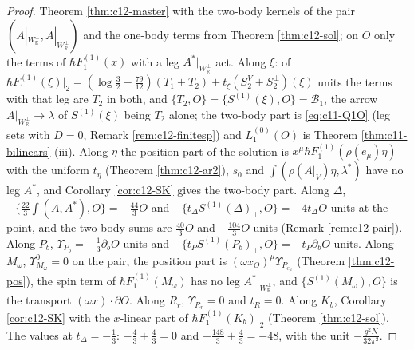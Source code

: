 \begin{proof}
Theorem \ref{thm:c12-master} with the two-body kernels of the pair $(A|_{W_{\mathbb R}^\perp},A|_{W_{\mathbb R}^\perp})$ and the one-body terms from Theorem \ref{thm:c12-sol}; on $O$ only the terms of $\hbar F_1^{(1)}(x)$ with a leg $A^*|_{W_{\mathbb R}^\perp}$ act. Along $\xi$: of $\hbar F_1^{(1)}(\xi)|_2=(\log\tfrac32-\tfrac{79}{12})(T_1+T_2)+t_\xi(S^V_2+S^\perp_2)(\xi)$ units the terms with that leg are $T_2$ in both, and $\{T_2,O\}=\{S^{(1)}(\xi),O\}=\mathcal B_1$, the arrow $A|_{W_{\mathbb R}^\perp}\to\lambda$ of $S^{(1)}(\xi)$ being $T_2$ alone; the two-body part is \eqref{eq:c11-Q1O} (leg sets with $D=0$, Remark \ref{rem:c12-finitesp}) and $L_1^{(0)}(O)$ is Theorem \ref{thm:c11-bilinears} (iii). Along $\eta$ the position part of the solution is $x^\mu\hbar F_1^{(1)}(\rho(e_\mu)\eta)$ with the uniform $t_\eta$ (Theorem \ref{thm:c12-ar2}), $s_0$ and $\int(\rho(A|_V)\eta,\lambda^*)$ have no leg $A^*$, and Corollary \ref{cor:c12-SK} gives the two-body part. Along $\Delta$, $-\{\tfrac{22}3\int(A,A^*),O\}=-\tfrac{44}3O$ and $-\{t_\Delta S^{(1)}(\Delta)_\perp,O\}=-4t_\Delta O$ units at the point, and the two-body sums are $\tfrac{40}3O$ and $-\tfrac{104}3O$ units (Remark \ref{rem:c12-pair}). Along $P_b$, $\Upsilon_{P_b}=-\tfrac13\partial_bO$ units and $-\{t_PS^{(1)}(P_b)_\perp,O\}=-t_P\partial_bO$ units. Along $M_\omega$, $\Upsilon^0_{M_\omega}=0$ on the pair, the position part is $(\omega x_O)^\mu\Upsilon_{P_{e_\mu}}$ (Theorem \ref{thm:c12-pos}), the spin term of $\hbar F_1^{(1)}(M_\omega)$ has no leg $A^*|_{W_{\mathbb R}^\perp}$, and $\{S^{(1)}(M_\omega),O\}$ is the transport $(\omega x)\cdot\partial O$. Along $R_r$, $\Upsilon_{R_r}=0$ and $t_R=0$. Along $K_b$, Corollary \ref{cor:c12-SK} with the $x$-linear part of $\hbar F_1^{(1)}(K_b)|_2$ (Theorem \ref{thm:c12-sol}). The values at $t_\Delta=-\tfrac13$: $-\tfrac43+\tfrac43=0$ and $-\tfrac{148}3+\tfrac43=-48$, with the unit $-\tfrac{g^2N}{32\pi^2}$.
\end{proof}

